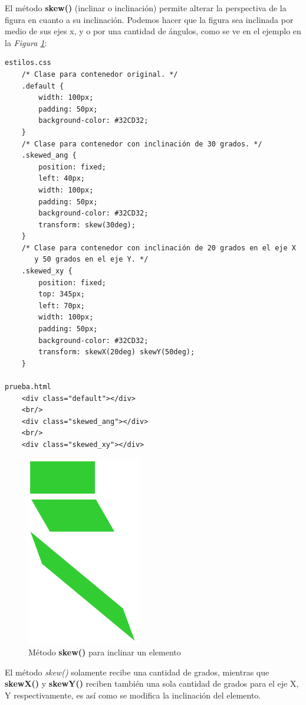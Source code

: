El método \textbf{skew()} (inclinar o inclinación) permite alterar la perspectiva de la figura en cuanto a su inclinación. Podemos hacer que la figura sea inclinada por medio de sus ejes x, y o por una cantidad de ángulos, como se ve en el ejemplo en la \textit{Figura \ref{fig: 55}}:
\begin{lstlisting}
estilos.css
    /* Clase para contenedor original. */
    .default {
        width: 100px;
        padding: 50px;
        background-color: #32CD32;
    }
    /* Clase para contenedor con inclinación de 30 grados. */
    .skewed_ang {
        position: fixed;
        left: 40px;
        width: 100px;
        padding: 50px;
        background-color: #32CD32;
        transform: skew(30deg);
    }
    /* Clase para contenedor con inclinación de 20 grados en el eje X
       y 50 grados en el eje Y. */
    .skewed_xy {
        position: fixed;
        top: 345px;
        left: 70px;
        width: 100px;
        padding: 50px;
        background-color: #32CD32;
        transform: skewX(20deg) skewY(50deg);
    }

prueba.html
    <div class="default"></div>
    <br/>
    <div class="skewed_ang"></div>
    <br/>
    <div class="skewed_xy"></div>
\end{lstlisting}
\begin{figure}[H]
    \centering
    \caption{Método \textbf{skew()} para inclinar un elemento}
    \label{fig: 55}
    \includegraphics[width=5cm]{ss/skew.png}
\end{figure}

El método \textit{skew()} solamente recibe una cantidad de grados, mientras que \textbf{skewX()} y \textbf{skewY()} reciben también una sola cantidad de grados para el eje X, Y respectivamente, es así como se modifica la inclinación del elemento.


